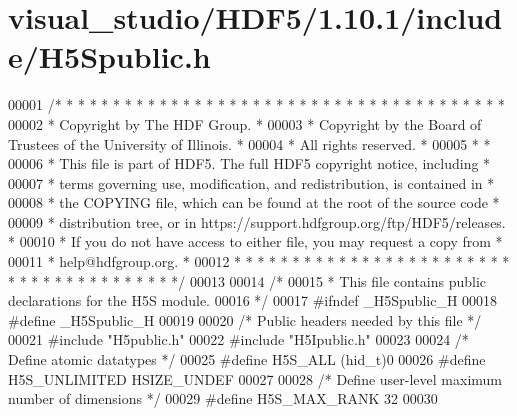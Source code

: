 \hypertarget{visual__studio_2_h_d_f5_21_810_81_2include_2_h5_spublic_8h_source}{}\section{visual\+\_\+studio/\+H\+D\+F5/1.10.1/include/\+H5\+Spublic.h}
\label{visual__studio_2_h_d_f5_21_810_81_2include_2_h5_spublic_8h_source}

\begin{DoxyCode}
00001 \textcolor{comment}{/* * * * * * * * * * * * * * * * * * * * * * * * * * * * * * * * * * * * * * *}
00002 \textcolor{comment}{ * Copyright by The HDF Group.                                               *}
00003 \textcolor{comment}{ * Copyright by the Board of Trustees of the University of Illinois.         *}
00004 \textcolor{comment}{ * All rights reserved.                                                      *}
00005 \textcolor{comment}{ *                                                                           *}
00006 \textcolor{comment}{ * This file is part of HDF5.  The full HDF5 copyright notice, including     *}
00007 \textcolor{comment}{ * terms governing use, modification, and redistribution, is contained in    *}
00008 \textcolor{comment}{ * the COPYING file, which can be found at the root of the source code       *}
00009 \textcolor{comment}{ * distribution tree, or in https://support.hdfgroup.org/ftp/HDF5/releases.  *}
00010 \textcolor{comment}{ * If you do not have access to either file, you may request a copy from     *}
00011 \textcolor{comment}{ * help@hdfgroup.org.                                                        *}
00012 \textcolor{comment}{ * * * * * * * * * * * * * * * * * * * * * * * * * * * * * * * * * * * * * * */}
00013 
00014 \textcolor{comment}{/*}
00015 \textcolor{comment}{ * This file contains public declarations for the H5S module.}
00016 \textcolor{comment}{ */}
00017 \textcolor{preprocessor}{#ifndef \_H5Spublic\_H}
00018 \textcolor{preprocessor}{#define \_H5Spublic\_H}
00019 
00020 \textcolor{comment}{/* Public headers needed by this file */}
00021 \textcolor{preprocessor}{#include "H5public.h"}
00022 \textcolor{preprocessor}{#include "H5Ipublic.h"}
00023 
00024 \textcolor{comment}{/* Define atomic datatypes */}
00025 \textcolor{preprocessor}{#define H5S\_ALL         (hid\_t)0}
00026 \textcolor{preprocessor}{#define H5S\_UNLIMITED   HSIZE\_UNDEF}
00027 
00028 \textcolor{comment}{/* Define user-level maximum number of dimensions */}
00029 \textcolor{preprocessor}{#define H5S\_MAX\_RANK    32}
00030 

\end{DoxyCode}
